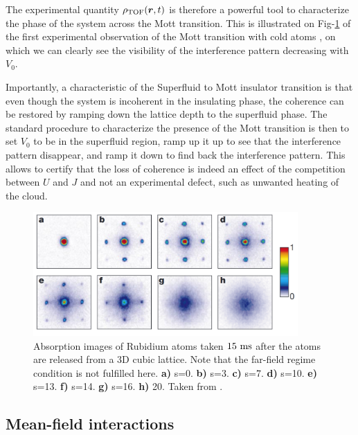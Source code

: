 The experimental quantity $\rho_{\rm{TOF}}(\bm{r},t)$ is therefore a powerful tool to characterize the phase of the system across the Mott transition. This is illustrated on Fig-\ref{fig:mott_greiner} of the first experimental observation of the Mott transition with cold atoms \cite{greiner2002quantum}, on which we can clearly see the visibility of the interference pattern decreasing with $V_0$.

Importantly, a characteristic of the Superfluid to Mott insulator transition is that even though the system is incoherent in the insulating phase, the coherence can be restored by ramping down the lattice depth to the superfluid phase. The standard procedure to characterize the presence of the Mott transition is then to set $V_0$ to be in the superfluid region, ramp up it up to see that the interference pattern disappear, and ramp it down to find back the interference pattern. This allows to certify that the loss of coherence is indeed an effect of the competition between $U$ and $J$ and not an experimental defect, such as unwanted heating of the cloud. 

\begin{figure}
    \centering
    \includegraphics[width=0.9\textwidth]{Fig/Chapter2/mott_greiner.png}
    \caption[Absorption images of Rubidium atoms across the Mott transition]{Absorption images of Rubidium atoms taken $15 \ \rm{ms}$ after the atoms are released from a 3D cubic lattice. Note that the far-field regime condition is not fulfilled here. \textbf{a)} s=0. \textbf{b)} s=3. \textbf{c)} s=7. \textbf{d)} s=10. \textbf{e)} s=13. \textbf{f)} s=14. \textbf{g)} s=16. \textbf{h)} 20. Taken from \cite{greiner2002quantum}.}
    \label{fig:mott_greiner}
\end{figure}


\subsection{Mean-field interactions}

